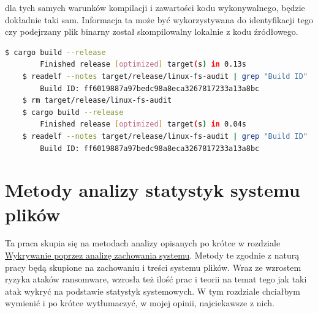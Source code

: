 dla tych samych warunków kompilacji i zawartości kodu wykonywalnego, będzie dokładnie taki sam. Informacja ta może być wykorzystywana do
identyfikacji tego czy podejrzany plik binarny został skompilowalny lokalnie z kodu źródłowego.
\newpage
\begin{lstlisting}[language=bash,
    backgroundcolor=\color{EEGold!5!white},
    caption={Test rekompilacji aplikacji napisanej w języku Rust. Mimo ponownej kompilacji, przy braku zmiany kodu źródłowego, identyfikator pozostał ten sam.
    Można więc z dużą pewnością stwierdzić, że plik wykonywalny był skompilowalny na tej maszynie, a nie pobrany z internetu.},
    label={lst:helloC}]
    $ cargo build --release
        Finished release [optimized] target(s) in 0.13s
    $ readelf --notes target/release/linux-fs-audit | grep "Build ID"
        Build ID: ff6019887a97bedc98a8eca3267817233a13a8bc
    $ rm target/release/linux-fs-audit
    $ cargo build --release
        Finished release [optimized] target(s) in 0.04s
    $ readelf --notes target/release/linux-fs-audit | grep "Build ID"
        Build ID: ff6019887a97bedc98a8eca3267817233a13a8bc
\end{lstlisting}
\section{Metody analizy statystyk systemu plików}
Ta praca skupia się na metodach analizy opisanych po krótce w rozdziale \hyperref[sec:behav]{Wykrywanie poprzez analizę zachowania systemu}.
Metody te zgodnie z naturą pracy będą skupione na zachowaniu i treści systemu plików. 
Wraz ze wzrostem ryzyka ataków ransomware, wzrosła też ilość prac i teorii na temat tego jak  taki atak wykryć
na podstawie statystyk systemowych. W tym rozdziale chciałbym wymienić i po krótce wytłumaczyć, w mojej opinii, najciekawsze z nich.
